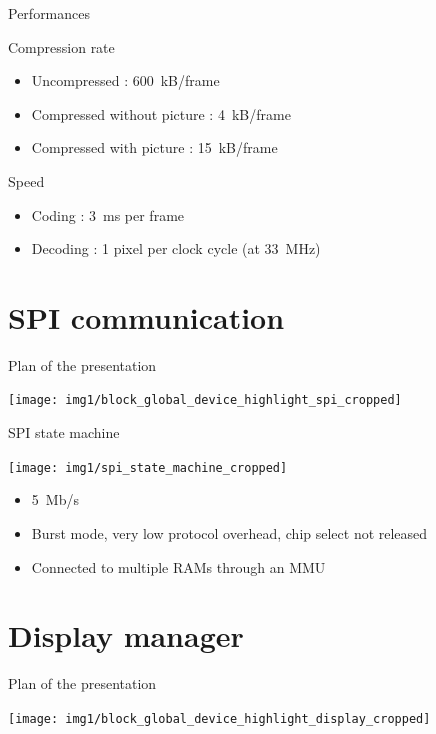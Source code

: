 \documentclass[10pt, notes]{beamer}
\begin{document}
\begin{frame}{Performances}
    \begin{block}{Compression rate}
        \begin{itemize}
            \item Uncompressed : \SI{600}{kB/frame}
            \item Compressed without picture : \SI{4}{kB/frame}
            \item Compressed with picture : \SI{15}{kB/frame} 
        \end{itemize}
    \end{block}
        
    \begin{block}{Speed}
        \begin{itemize}
            \item Coding : \SI{3}{ms} per frame
            \item Decoding : 1 pixel per clock cycle (at \SI{33}{\mega\hertz})
        \end{itemize}
    \end{block}
\end{frame}

\section{SPI communication}
\begin{frame}{Plan of the presentation}
    \begin{center}
        \texttt{[image: img1/block\_global\_device\_highlight\_spi\_cropped]}
    \end{center}
\end{frame}

\begin{frame}{SPI state machine}
    \begin{center}
        \texttt{[image: img1/spi\_state\_machine\_cropped]}
    \end{center}

    \begin{itemize}
        \item \SI{5}{Mb/s}
        \item Burst mode, very low protocol overhead, chip select not released
        \item Connected to multiple RAMs through an MMU
    \end{itemize}
\end{frame}

\section{Display manager}
\begin{frame}{Plan of the presentation}
    \begin{center}
        \texttt{[image: img1/block\_global\_device\_highlight\_display\_cropped]}
    \end{center}
\end{frame}
\end{document}

